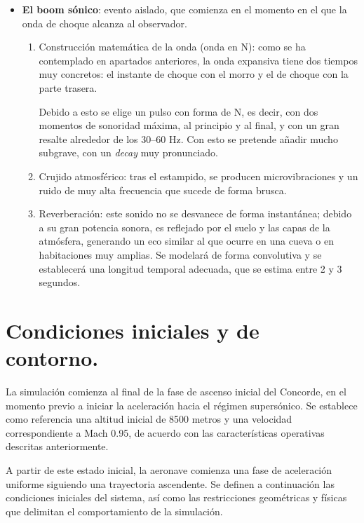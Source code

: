 \documentclass[10.5pt]{article}
\begin{document}
\begin{itemize}
		\item \textbf{El boom sónico}: evento aislado, que comienza en el momento en el que la onda de choque alcanza al observador. 
		
		\begin{enumerate}
			\item Construcción matemática de la onda (onda en N): como se ha contemplado en apartados anteriores, la onda expansiva tiene dos tiempos muy concretos: el instante de choque con el morro y el de choque con la parte trasera.
			
			Debido a esto se elige un pulso con forma de N, es decir, con dos momentos de sonoridad máxima, al principio y al final, y con un gran resalte alrededor de los 30--60 Hz. Con esto se pretende añadir mucho subgrave, con un \textit{decay} muy pronunciado.
			
			\item Crujido atmosférico: tras el estampido, se producen microvibraciones y un ruido de muy alta frecuencia que sucede de forma brusca.
			
			\item Reverberación: este sonido no se desvanece de forma instantánea; debido a su gran potencia sonora, es reflejado por el suelo y las capas de la atmósfera, generando un eco similar al que ocurre en una cueva o en habitaciones muy amplias. Se modelará de forma convolutiva y se establecerá una longitud temporal adecuada, que se estima entre 2 y 3 segundos. 
			
		\end{enumerate}
	\end{itemize}
	
	\newpage
	
	\section{Condiciones iniciales y de contorno.}
	
	La simulación comienza al final de la fase de ascenso inicial del Concorde, en el momento previo a iniciar la aceleración hacia el régimen supersónico. Se establece como referencia una altitud inicial de 8500 metros y una velocidad correspondiente a Mach 0.95, de acuerdo con las características operativas descritas anteriormente.
	
	A partir de este estado inicial, la aeronave comienza una fase de aceleración uniforme siguiendo una trayectoria ascendente. Se definen a continuación las condiciones iniciales del sistema, así como las restricciones geométricas y físicas que delimitan el comportamiento de la simulación.
	
\end{document}
